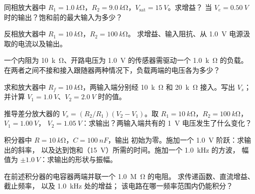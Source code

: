 \begin{exercise}[$\star$]\label{exo:b1:operational-amplifier:1}
同相放大器中 $R_1 = \qty{1.0}{k\ohm}$，$R_2 =
\qty{9.0}{k\ohm}$，$V_{\mathrm{sat}} = \qty{15}{V}$。求增益？
当 $V_e = \qty{0.50}{V}$ 时的输出？饱和前的最大输入为多少？
\end{exercise}

\begin{exercise}[$\star$]\label{exo:b1:operational-amplifier:2}
反相放大器中 $R_1 = \qty{10}{k\ohm}$，$R_2 = \qty{100}{k\ohm}$。
求增益、输入阻抗、从 \qty{1.0}{V} 电源汲取的电流以及输出。
\end{exercise}

\begin{exercise}[$\star$]\label{exo:b1:operational-amplifier:3}
一个内阻为 \qty{10}{k\ohm}、开路电压为
\qty{1.0}{V} 的传感器需驱动一个 \qty{1.0}{k\ohm} 的负载。
在两者之间不接和接入跟随器两种情况下，负载两端的电压各为多少？
\end{exercise}

\begin{exercise}[$\star$]\label{exo:b1:operational-amplifier:4}
求和放大器中 $R_f = \qty{10}{k\ohm}$，两输入端分别经
\qty{10}{k\ohm} 和 \qty{20}{k\ohm} 接入。写出 $V_s$；并计算
$V_1 = \qty{1.0}{V}$、$V_2 = \qty{2.0}{V}$ 时的值。
\end{exercise}

\begin{exercise}[$\star\star$]\label{exo:b1:operational-amplifier:5}
推导差分放大器的 $V_s = (R_2/R_1)(V_2 - V_1)$。取
$R_1 = \qty{10}{k\ohm}$，$R_2 = \qty{100}{k\ohm}$，$V_1 = \qty{1.00}{V}$，
$V_2 = \qty{1.05}{V}$：求输出？两输入端共有的
\qty{1}{V} 电压发生了什么变化？
\end{exercise}

\begin{exercise}[$\star\star$]\label{exo:b1:operational-amplifier:6}
积分器中 $R = \qty{10}{k\ohm}$，$C = \qty{100}{nF}$，输出
初始为零。施加一个 \qty{1.0}{V} 阶跃：求输出的斜率，
以及达到饱和（\qty{15}{V}）所需的时间。施加一个 \qty{1.0}{kHz} 的方波，
幅值为 $\pm\qty{1.0}{V}$：求输出的形状与振幅。
\end{exercise}

\begin{exercise}[$\star\star$]\label{exo:b1:operational-amplifier:7}
在前述积分器的电容器两端并联一个 \qty{1.0}{M\ohm} 的电阻。
求传递函数、直流增益、截止频率，
以及 \qty{1.0}{kHz} 处的增益；
该电路在哪一频率范围内仍能积分？
\end{exercise}

